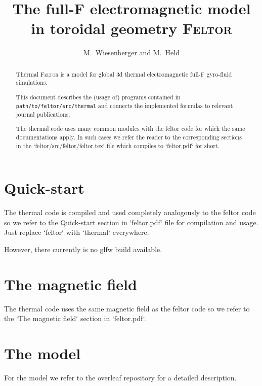 


\usepackage{minted}



\title{
The full-F electromagnetic model in toroidal geometry \textsc{Feltor}}
\author{ M.~Wiesenberger and M.~Held}
\maketitle

\begin{abstract}
Thermal \textsc{Feltor} is a model for global 3d thermal electromagnetic full-F gyro-fluid simulations.

\noindent
This document describes the (usage of) programs
contained in \texttt{path/to/feltor/src/thermal}
and connects
the implemented formulas to relevant journal publications.

The thermal code uses many common modules with the feltor code for which the same documentations apply. In such cases we refer the reader to the corresponding sections in the `feltor/src/feltor/feltor.tex` file which compiles to `feltor.pdf` for short.
\end{abstract}
\tableofcontents

\section{Quick-start}
The thermal code is compiled and used completely analogously to the feltor code so we refer to the Quick-start section in `feltor.pdf` file for compilation and usage. Just replace `feltor` with `thermal` everywhere.

However, there currently is no glfw build available.
\section{The magnetic field} \label{sec:magnetic}
The thermal code uses the same magnetic field as the feltor code so we refer to the `The magnetic field` section in `feltor.pdf`.


\section{The model} \label{sec:model}
For the model we refer to the overleaf repository for a detailed description.

